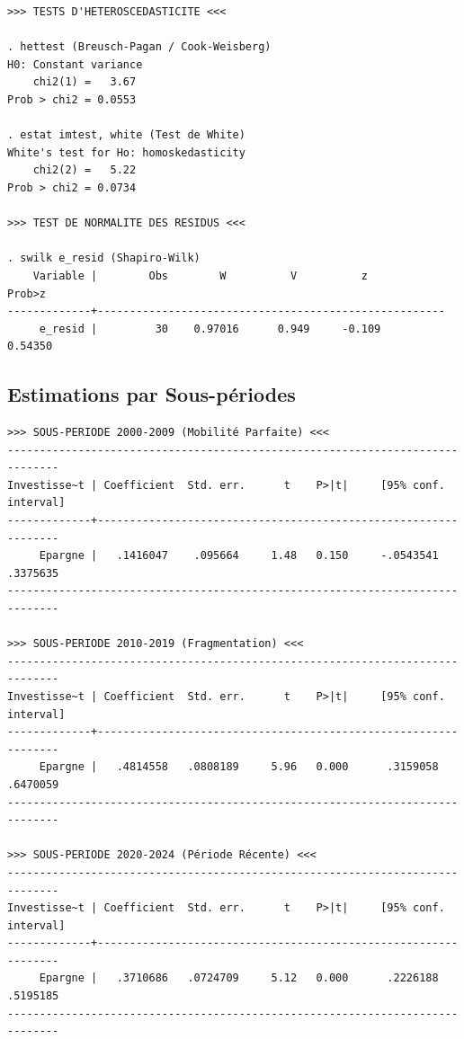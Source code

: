\documentclass[12pt, a4paper]{article}
\begin{document}
{\begin{verbatim}
>>> TESTS D'HETEROSCEDASTICITE <<<

. hettest (Breusch-Pagan / Cook-Weisberg)
H0: Constant variance
    chi2(1) =   3.67
Prob > chi2 = 0.0553

. estat imtest, white (Test de White)
White's test for Ho: homoskedasticity
    chi2(2) =   5.22
Prob > chi2 = 0.0734

>>> TEST DE NORMALITE DES RESIDUS <<<

. swilk e_resid (Shapiro-Wilk)
    Variable |        Obs        W          V          z         Prob>z
-------------+------------------------------------------------------
     e_resid |         30    0.97016      0.949     -0.109      0.54350
\end{verbatim}

\newpage

\subsection{Estimations par Sous-périodes}
\begin{verbatim}
>>> SOUS-PERIODE 2000-2009 (Mobilité Parfaite) <<<
------------------------------------------------------------------------------
Investisse~t | Coefficient  Std. err.      t    P>|t|     [95% conf. interval]
-------------+----------------------------------------------------------------
     Epargne |   .1416047    .095664     1.48   0.150     -.0543541   .3375635
------------------------------------------------------------------------------

>>> SOUS-PERIODE 2010-2019 (Fragmentation) <<<
------------------------------------------------------------------------------
Investisse~t | Coefficient  Std. err.      t    P>|t|     [95% conf. interval]
-------------+----------------------------------------------------------------
     Epargne |   .4814558   .0808189     5.96   0.000      .3159058   .6470059
------------------------------------------------------------------------------

>>> SOUS-PERIODE 2020-2024 (Période Récente) <<<
------------------------------------------------------------------------------
Investisse~t | Coefficient  Std. err.      t    P>|t|     [95% conf. interval]
-------------+----------------------------------------------------------------
     Epargne |   .3710686   .0724709     5.12   0.000      .2226188   .5195185
------------------------------------------------------------------------------
\end{verbatim}

}
\end{document}
